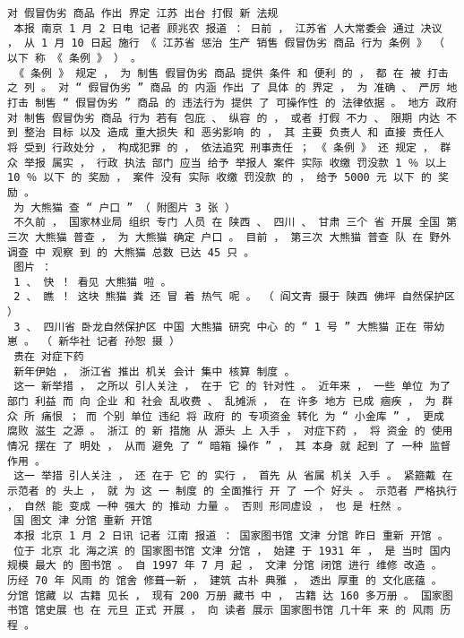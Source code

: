 \documentclass{article}
\begin{document}
\begin{Verbatim}[commandchars=\\\{\}]
 对 假冒伪劣 商品 作出 界定 江苏 出台 打假 新 法规 
 本报 南京 1 月 2 日电 记者 顾兆农 报道 ： 日前 ， 江苏省 人大常委会 通过 决议 ， 从 1 月 10 日起 施行 《 江苏省 惩治 生产 销售 假冒伪劣 商品 行为 条例 》 （ 以下 称 《 条例 》 ） 。 
 《 条例 》 规定 ， 为 制售 假冒伪劣 商品 提供 条件 和 便利 的 ， 都 在 被 打击 之 列 。 对 “ 假冒伪劣 ” 商品 的 内涵 作出 了 具体 的 界定 ， 为 准确 、 严厉 地 打击 制售 “ 假冒伪劣 ” 商品 的 违法行为 提供 了 可操作性 的 法律依据 。 地方 政府 对 制售 假冒伪劣 商品 行为 若有 包庇 、 纵容 的 ， 或者 打假 不力 、 限期 内达 不到 整治 目标 以及 造成 重大损失 和 恶劣影响 的 ， 其 主要 负责人 和 直接 责任人 将 受到 行政处分 ， 构成犯罪 的 ， 依法追究 刑事责任 ； 《 条例 》 还 规定 ， 群众 举报 属实 ， 行政 执法 部门 应当 给予 举报人 案件 实际 收缴 罚没款 1 ％ 以上 10 ％ 以下 的 奖励 ， 案件 没有 实际 收缴 罚没款 的 ， 给予 5000 元 以下 的 奖励 。 
 为 大熊猫 查 “ 户口 ” （ 附图片 3 张 ） 
 不久前 ， 国家林业局 组织 专门 人员 在 陕西 、 四川 、 甘肃 三个 省 开展 全国 第三次 大熊猫 普查 ， 为 大熊猫 确定 户口 。 目前 ， 第三次 大熊猫 普查 队 在 野外 调查 中 观察 到 的 大熊猫 总数 已达 45 只 。 
 图片 ： 
 1 、 快 ！ 看见 大熊猫 啦 。 
 2 、 瞧 ！ 这块 熊猫 粪 还 冒 着 热气 呢 。 （ 阎文青 摄于 陕西 佛坪 自然保护区 ） 
 3 、 四川省 卧龙自然保护区 中国 大熊猫 研究 中心 的 “ 1 号 ” 大熊猫 正在 带幼 崽 。 （ 新华社 记者 孙恕 摄 ） 
 贵在 对症下药 
 新年伊始 ， 浙江省 推出 机关 会计 集中 核算 制度 。 
 这一 新举措 ， 之所以 引人关注 ， 在于 它 的 针对性 。 近年来 ， 一些 单位 为了 部门 利益 而 向 企业 和 社会 乱收费 、 乱摊派 ， 在 许多 地方 已成 痼疾 ， 为 群众 所 痛恨 ； 而 个别 单位 违纪 将 政府 的 专项资金 转化 为 “ 小金库 ” ， 更成 腐败 滋生 之源 。 浙江 的 新 措施 从 源头 上 入手 ， 对症下药 ， 将 资金 的 使用 情况 摆在 了 明处 ， 从而 避免 了 “ 暗箱 操作 ” ， 其 本身 就 起到 了 一种 监督 作用 。 
 这一 举措 引人关注 ， 还 在于 它 的 实行 ， 首先 从 省属 机关 入手 。 紧箍戴 在 示范者 的 头上 ， 就 为 这 一 制度 的 全面推行 开 了 一个 好头 。 示范者 严格执行 ， 自然 能 变成 一种 强大 的 推动 力量 。 否则 形同虚设 ， 也 是 枉然 。 
 国 图文 津 分馆 重新 开馆 
 本报 北京 1 月 2 日讯 记者 江南 报道 ： 国家图书馆 文津 分馆 昨日 重新 开馆 。 
 位于 北京 北 海之滨 的 国家图书馆 文津 分馆 ， 始建 于 1931 年 ， 是 当时 国内 规模 最大 的 图书馆 。 自 1997 年 7 月 起 ， 文津 分馆 闭馆 进行 维修 改造 。 历经 70 年 风雨 的 馆舍 修葺一新 ， 建筑 古朴 典雅 ， 透出 厚重 的 文化底蕴 。 分馆 馆藏 以 古籍 见长 ， 现有 200 万册 藏书 中 ， 古籍 达 160 多万册 。 国家图书馆 馆史展 也 在 元旦 正式 开展 ， 向 读者 展示 国家图书馆 几十年 来 的 风雨 历程 。 

\end{Verbatim}
\end{document}
